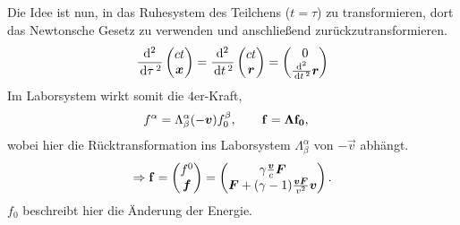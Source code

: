 Die Idee ist nun, in das Ruhesystem des Teilchens ($t=\tau$) zu transformieren,
dort das Newtonsche Gesetz zu verwenden und anschließend zurückzutransformieren.
\begin{align*}
\frac{\mathrm{d}^2}{\,\mathrm{d} \tau\,^2}\begin{pmatrix}ct\\\bm{x}\end{pmatrix}
= \frac{\mathrm{d}^2}{\,\mathrm{d} t\,^2}\begin{pmatrix}ct\\\bm{r}\end{pmatrix}
= \begin{pmatrix}0\\\frac{\mathrm{d}^2}{\,\mathrm{d} t\,^2}\bm{r}\end{pmatrix}
\end{align*}
Im Laborsystem wirkt somit die $4$er-Kraft,
\begin{align*}
&f^\alpha = \Lambda_\beta^\alpha(-\bm{v})f_0^\beta,\qquad
\bm{\mathrm{f}} = \bm{\mathrm{\Lambda}}\bm{\mathrm{f_0}},
\end{align*}
wobei hier die Rücktransformation ins Laborsystem $\Lambda_\beta^\alpha$ von
$-\vec{v}$ abhängt.
\begin{align*}
\Rightarrow
\bm{\mathrm{f}} = \begin{pmatrix}f^0\\\bm{f}\end{pmatrix}
= 
\begin{pmatrix}
\gamma\frac{\bm{v}}{c}\bm{F}\\
\bm{F} + (\gamma-1)\frac{\bm{v}\bm{F}}{v^2}\bm{v}
\end{pmatrix}.
\end{align*}
$f_0$ beschreibt hier die Änderung der Energie.
